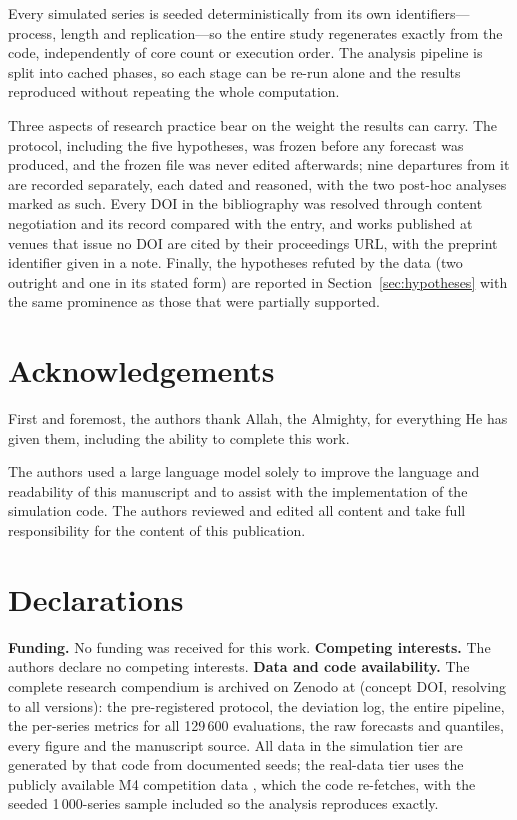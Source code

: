 \documentclass[article]{ajs}
\providecommand{\sectionref}[1]{Section~\ref{#1}}
\begin{document}
Every simulated series is seeded deterministically from its own identifiers---process, length
and replication---so the entire study regenerates exactly from the code, independently of core
count or execution order. The analysis pipeline is split into cached phases, so each stage can
be re-run alone and the results reproduced without repeating the whole computation.

Three aspects of research practice bear on the weight the results can carry. The protocol, including the five hypotheses, was frozen before any
forecast was produced, and the frozen file was never edited afterwards; nine departures from it
are recorded separately, each dated and reasoned, with the two post-hoc analyses marked as such.
Every DOI in the bibliography was resolved through  content negotiation and its
record compared with the entry, and works published at venues that issue no DOI are cited by
their proceedings URL, with the preprint identifier given in a note. Finally, the hypotheses
refuted by the data (two outright and one in its stated form) are reported in \sectionref{sec:hypotheses} with the same prominence as those
that were partially supported.

\section*{Acknowledgements}

First and foremost, the authors thank Allah, the Almighty, for everything He has given them,
including the ability to complete this work.

The authors used a large language model solely to improve the language and readability of this
manuscript and to assist with the implementation of the simulation code. The authors reviewed and
edited all content and take full responsibility for the content of this publication.

\section*{Declarations}

\textbf{Funding.} No funding was received for this work.
\textbf{Competing interests.} The authors declare no competing interests.
\textbf{Data and code availability.} The complete research compendium is archived on Zenodo at
 (concept DOI, resolving to all versions): the pre-registered
protocol, the deviation log, the entire pipeline, the per-series metrics for all 129\,600
evaluations, the raw forecasts and quantiles, every figure and the manuscript source. All data
in the simulation tier are generated by that code from documented seeds; the real-data tier uses
the publicly available M4 competition data \citep{makridakis2020m4}, which the code re-fetches,
with the seeded 1\,000-series sample included so the analysis reproduces exactly.
\end{document}

